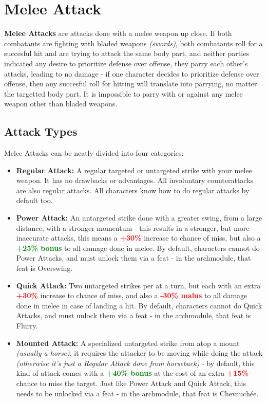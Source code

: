 \documentclass[tikz,openany,11pt,a4paper]{book}
\newcommand{\Bonus}[1]{\textcolor{green}{\textbf{+{#1} bonus}}}
\newcommand{\Malus}[1]{\textcolor{red}{\textbf{-{#1} malus}}}
\newcommand{\MalusPS}[1]{\textcolor{red}{\textbf{+{#1}}}}
\begin{document}
\section{Melee Attack}
\textbf{Melee Attacks} are attacks done with a melee weapon up close. If both combatants are fighting with bladed weapons \textit{(swords)}, both combatants roll for a succesful hit and are trying to attack the same body part, and neither parties indicated any desire to prioritize defense over offense, they parry each other's attacks, leading to no damage - if one character decides to prioritize defense over offense, then any succesful roll for hitting will translate into parrying, no matter the targetted body part. It is impossible to parry with or against any melee weapon other than bladed weapons.
\subsection{Attack Types}
Melee Attacks can be neatly divided into four categories:
\begin{itemize}
  \item \textbf{Regular Attack:} A regular targeted or untargeted strike with your melee weapon. It has no drawbacks or advantages. All involuntary counterattacks are also regular attacks. All characters know how to do regular attacks by default too.
  \item \textbf{Power Attack:} An untargeted strike done with a greater swing, from a large distance, with a stronger momentum - this results in a stronger, but more inaccurate attacks, this means a \MalusPS{30\%} increase to chance of miss, but also a \Bonus{25\%} to all damage done in melee. By default, characters cannot do Power Attacks, and must unlock them via a feat - in the archmodule, that feat is Overswing.
  \item \textbf{Quick Attack:} Two untargeted strikes per at a turn, but each with an extra \MalusPS{30\%} increase to chance of miss, and also a \Malus{30\%} to all damage done in melee in case of landing a hit. By default, characters cannot do Quick Attacks, and must unlock them via a feat - in the archmodule, that feat is Flurry.
  \item \textbf{Mounted Attack:} A specialized untargeted strike from atop a mount \textit{(usually a horse)}, it requires the attacker to be moving while doing the attack \textit{(otherwise it's just a Regular Attack done from horseback)} - by default, this kind of attack comes with a \Bonus{40\%} at the cost of an extra \MalusPS{15\%} chance to miss the target. Just like Power Attack and Quick Attack, this needs to be unlocked via a feat - in the archmodule, that feat is Chevauchée.
\end{itemize}
\end{document}
